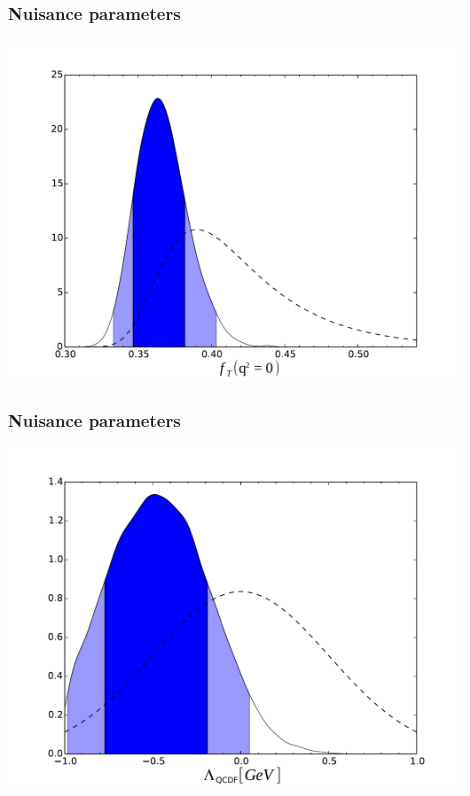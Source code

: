 \documentclass[english]{beamer}
\newcommand{\slide}[2][t]{\begin{frame}[#1] \frametitle{\insertsection} #2 \end{frame}}
\begin{document}
\slide[t]{

    \frametitle{Nuisance parameters}

    \begin{center}
        \includegraphics[width=0.9\textwidth]{figures/FF_ft0}
    \end{center}

}

\slide{

    \frametitle{Nuisance parameters}

    \begin{center}
        \includegraphics[width=0.9\textwidth]{figures/SL_large_recoil}
    \end{center}

}
\end{document}
